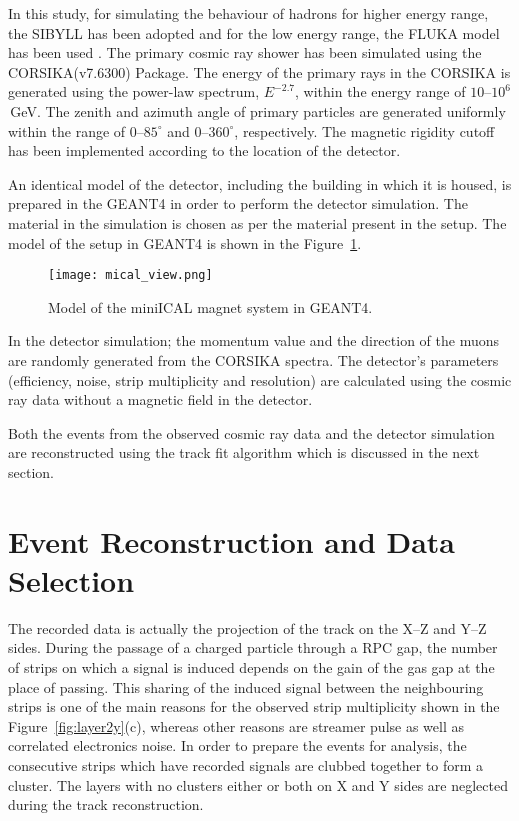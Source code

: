 In this study, for simulating the behaviour of hadrons for higher
energy range, the SIBYLL has been adopted and
for the low energy range, the FLUKA model has been used
\cite{corsika763}. The primary cosmic ray shower has been simulated
using the CORSIKA(v7.6300) Package. The energy of the primary rays in
the CORSIKA is generated using the power-law spectrum, $E^{-2.7}$,
within the energy range of \mbox{$10$--$10^{6}$\,GeV}. The zenith and
azimuth angle of primary particles are generated uniformly within the
range of \mbox{$0$--$85^\circ$} and \mbox{$0$--$360^\circ$},
respectively. The magnetic rigidity cutoff has been implemented
according to the location of the detector.

An identical model of the detector, including the building in which it
is housed, is prepared in the GEANT4 in order to perform the detector
simulation. The material in the simulation is chosen as per the
material present in the setup. The model of the setup in GEANT4 is
shown in the Figure~\ref{fig:miniICAL_view}.
\begin{figure}[h]
  \centering
  \texttt{[image: mical\_view.png]}
  \caption{Model of the miniICAL magnet system in GEANT4.}
  \label{fig:miniICAL_view}
\end{figure}
In the detector simulation; the momentum value and the direction
of the muons are randomly generated from the CORSIKA spectra.
The detector's parameters (efficiency, noise, strip multiplicity and
resolution) are calculated using the cosmic ray data without a magnetic
field in the detector.

Both the events from the observed cosmic ray data and the detector
simulation are reconstructed using the track fit algorithm which is
discussed in the next section.

\section{Event Reconstruction and Data Selection} \label{sec:momreco}
The recorded data is actually the projection of the track on the
\mbox{X--Z} and \mbox{Y--Z} sides. During the passage of a charged
particle through a RPC gap, the number of strips on which a signal is
induced depends on the gain of the gas gap at the place of passing.
This sharing of the induced signal between the neighbouring strips is
one of the main reasons for the observed strip multiplicity shown in the
Figure~\ref{fig:layer2y}(c), whereas other reasons are streamer pulse
as well as correlated electronics noise.
In order to prepare the events for analysis, the consecutive strips
which have recorded signals are clubbed together to form a cluster.
The layers with no clusters either or both on X and Y sides are
neglected during the track reconstruction.

